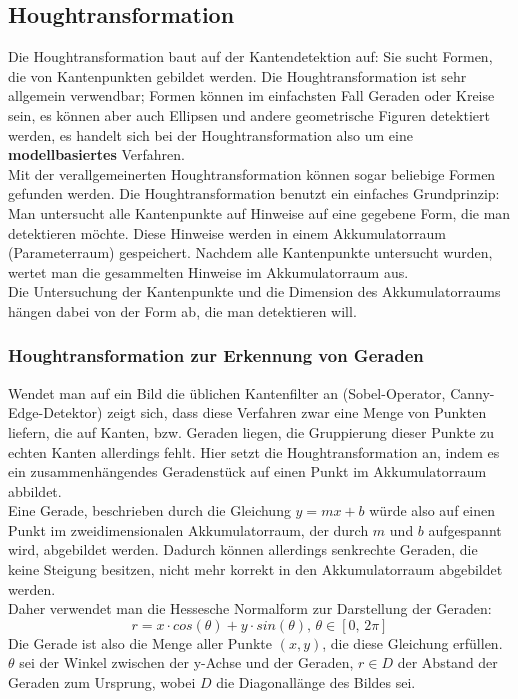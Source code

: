 	\subsection {Houghtransformation}
Die Houghtransformation \cite{ThomasBraeunl1995}  baut auf der Kantendetektion auf: Sie sucht Formen, die von Kantenpunkten gebildet werden.
Die Houghtransformation ist sehr allgemein verwendbar; Formen können im einfachsten Fall Geraden oder Kreise sein, es können aber auch Ellipsen und andere geometrische Figuren detektiert werden, es handelt sich bei der Houghtransformation also um eine \textbf{modellbasiertes} Verfahren. \\
Mit der verallgemeinerten Houghtransformation können sogar beliebige Formen gefunden werden.
Die Houghtransformation benutzt ein einfaches Grundprinzip: Man untersucht alle Kantenpunkte auf Hinweise auf eine gegebene Form, die man detektieren möchte. Diese Hinweise werden in einem Akkumulatorraum (Parameterraum) gespeichert. Nachdem alle Kantenpunkte untersucht wurden, wertet man die gesammelten Hinweise im Akkumulatorraum aus. \\
Die Untersuchung der Kantenpunkte und die Dimension des Akkumulatorraums hängen dabei von der Form ab, die man detektieren will.
		\subsubsection{Houghtransformation zur Erkennung von Geraden}
			Wendet man auf ein Bild die üblichen Kantenfilter an (Sobel-Operator, Canny-Edge-Detektor) zeigt sich, dass diese Verfahren zwar eine Menge von Punkten liefern, die auf Kanten, bzw. Geraden liegen, die Gruppierung dieser Punkte zu echten Kanten allerdings fehlt. Hier setzt die Houghtransformation an, indem es ein zusammenhängendes Geradenstück auf einen Punkt im Akkumulatorraum abbildet. \\
Eine Gerade, beschrieben durch die Gleichung $y = mx + b$ würde also auf einen Punkt im zweidimensionalen Akkumulatorraum, der durch $m$ und $b$ aufgespannt wird, abgebildet werden. Dadurch können allerdings senkrechte Geraden, die keine Steigung besitzen, nicht mehr korrekt in den Akkumulatorraum abgebildet werden. \\
Daher verwendet man die Hessesche Normalform zur Darstellung der Geraden:
\begin{equation*}
r = x \cdot cos (\theta) + y \cdot sin (\theta) ,\, \theta \in [0,\,2\pi ]
\end{equation*}
Die Gerade ist also die Menge aller Punkte $(x,y)$, die diese Gleichung erfüllen. $\theta$ sei der Winkel zwischen der y-Achse und der Geraden, $r \in D$ der Abstand der Geraden zum Ursprung, wobei $D$ die Diagonallänge des Bildes sei. 

